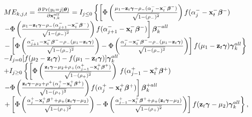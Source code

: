 \documentclass[letterpaper,fleqn,12pt]{article}
\begin{document}
\begin{onehalfspace}
$%
\begin{array}{l}
ME_{k,j,t}=\frac{\partial \Pr (y_{t}=j|\mathbf{\theta })}{\partial \mathbf{x}%
_{t,k}^{all}}=I_{j\leq 0}\left\{ \left[ \Phi \left( \frac{\mu _{1}-\mathbf{z}%
_{t}\mathbf{\gamma }-\rho _{-}(\alpha _{j}^{-}-\mathbf{x}_{t}^{-}\mathbf{%
\beta ^{-})}}{\sqrt{1-(\rho _{-})^{2}}}\right) f(\alpha _{j}^{-}-\mathbf{x}%
_{t}^{-}\mathbf{\beta ^{-}})\right. \right. \\ 
\left. -\Phi \left( \frac{\mu _{1}-\mathbf{z}_{t}\mathbf{\gamma }-\rho
_{-}(\alpha _{j+1}^{-}-\mathbf{x}_{t}^{-}\mathbf{\beta ^{-})}}{\sqrt{1-(\rho
_{-})^{2}}}\right) f(\alpha _{j+1}^{-}-\mathbf{x}_{t}^{-}\mathbf{\beta ^{-}})%
\right] \mathbf{\beta }_{k}^{-all} \\ 
\left. -\left[ \Phi \left( \frac{\alpha _{j+1}^{-}-\mathbf{x}_{t}^{-}\mathbf{%
\beta ^{-}}-\rho _{-}(\mu _{1}-\mathbf{z}_{t}\mathbf{\gamma )}}{\sqrt{%
1-(\rho _{-})^{2}}}\right) -\Phi \left( \frac{\alpha _{j}^{-}-\mathbf{x}%
_{t}^{-}\mathbf{\beta ^{-}}-\rho _{-}(\mu _{1}-\mathbf{z}_{t}\mathbf{\gamma )%
}}{\sqrt{1-(\rho _{-})^{2}}}\right) \right] f(\mu _{1}-\mathbf{z}_{t}\mathbf{%
\gamma })\mathbf{\gamma }_{k}^{all}\right\} \\ 
-I_{j=0}[f(\mu _{2}-\mathbf{z}_{t}\mathbf{\gamma })-f(\mu _{1}-\mathbf{z}_{t}%
\mathbf{\gamma })]\mathbf{\gamma }_{k}^{all} \\ 
+I_{j\geq 0}\left\{ \left[ \Phi \left( \frac{\mathbf{z}_{t}\mathbf{\gamma }%
-\mu _{2}+\rho _{+}(\alpha _{j-1}^{+}-\mathbf{x}_{t}^{+}\mathbf{\beta ^{+})}%
}{\sqrt{1-(\rho _{+})^{2}}}\right) \right. \right. f(\alpha _{j-1}^{+}-%
\mathbf{x}_{t}^{+}\mathbf{\beta ^{+}}) \\ 
\left. -\Phi \left( \frac{\mathbf{z}_{t}\mathbf{\gamma }-\mu _{2}+\rho
^{+}(\alpha _{j}^{+}-\mathbf{x}_{t}^{+}\mathbf{\beta ^{+})}}{\sqrt{1-(\rho
_{+})^{2}}}\right) f(\alpha _{j}^{+}-\mathbf{x}_{t}^{+}\mathbf{\beta ^{+}})%
\right] \mathbf{\beta }_{k}^{+all} \\ 
\left. +\left[ \Phi \left( \frac{\alpha _{j}^{+}-\mathbf{x}_{t}^{+}\mathbf{%
\beta ^{+}}+\rho _{+}(\mathbf{z}_{t}\mathbf{\gamma }-\mu _{2}\mathbf{)}}{%
\sqrt{1-(\rho _{+})^{2}}}\right) -\Phi \left( \frac{\alpha _{j-1}^{+}-%
\mathbf{x}_{t}^{+}\mathbf{\beta ^{+}}+\rho _{+}(\mathbf{z}_{t}\mathbf{\gamma 
}-\mu _{2}\mathbf{)}}{\sqrt{1-(\rho _{+})^{2}}}\right) \right] f(\mathbf{z}%
_{t}\mathbf{\gamma }-\mu _{2})\mathbf{\gamma }_{k}^{all}\right\} ,%
\end{array}%
$

\medskip


\end{onehalfspace}
\end{document}
